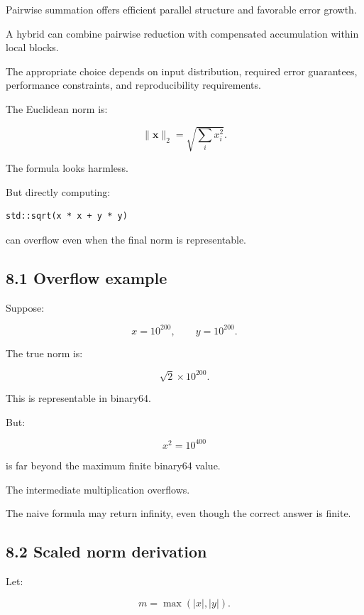 Pairwise summation offers efficient parallel structure and favorable error growth.

A hybrid can combine pairwise reduction with compensated accumulation within local blocks.

The appropriate choice depends on input distribution, required error guarantees, performance constraints, and reproducibility requirements.

The Euclidean norm is:

\[ \boxed{ \|\mathbf x\|_2= \sqrt{\sum_ix_i^2} }. \]

The formula looks harmless.

But directly computing:

\begin{verbatim}
std::sqrt(x * x + y * y)
\end{verbatim}

can overflow even when the final norm is representable.

\subsection{8.1 Overflow example}\label{02-foundations-ii-ch028-overflow-example}

\hypertarget{02-foundations-ii-ch028-overflow-example}{}

Suppose:

\[ x=10^{200},\qquad y=10^{200}. \]

The true norm is:

\[ \sqrt{2}\times10^{200}. \]

This is representable in binary64.

But:

\[ x^2=10^{400} \]

is far beyond the maximum finite binary64 value.

The intermediate multiplication overflows.

The naive formula may return infinity, even though the correct answer is finite.

\subsection{8.2 Scaled norm derivation}\label{02-foundations-ii-ch028-scaled-norm-derivation}

\hypertarget{02-foundations-ii-ch028-scaled-norm-derivation}{}

Let:

\[ m=\max(|x|,|y|). \]

